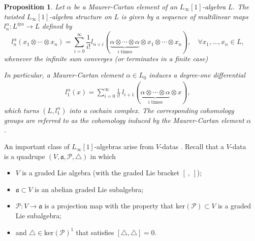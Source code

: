 \documentclass[12pt]{amsart}
\newtheorem{prop}[theorem]{Proposition}
\theoremstyle{definition}
\begin{document}
\begin{prop}\cite[Twisting procedure]{Get09}\label{Twisting procedure}
	Let $\alpha$ be a Maurer-Cartan element of an $L_\infty[1]$-algebra $L$. The twisted $L_\infty[1]$-algebra structure on $L$ is given by a sequence of multilinear maps $l_n^\alpha: L^{\otimes n} \to L$ defined by
	$$
	l_n^\alpha\left(x_1 \otimes \cdots \otimes x_n\right)=\sum_{i=0}^{\infty} \frac{1}{i!} l_{n+i}\left( \underbrace{\alpha\otimes \cdots\otimes \alpha}_{i \text{ times}}\otimes x_1 \otimes \cdots\otimes  x_n \right), \quad \forall x_1, \ldots, x_n \in L,
	$$ whenever the infinite sum converges (or terminates in a finite case)
	
	In particular, a Maurer-Cartan element $\alpha \in L_0$ induces a degree-one differential
	\begin{align*}
		l_1^\alpha (x) = \sum_{i=0}^\infty \frac{1}{i !} ~ \! l_{i+1} (\underbrace{\alpha\otimes \cdots\otimes \alpha}_{i \text{ times}}\otimes x),
	\end{align*}
	which turns $(L, l_1^\alpha)$ into a cochain complex. The corresponding cohomology groups are referred to as the cohomology induced by the Maurer-Cartan element $\alpha$.
	
	
\end{prop}




\medskip

An important class of $L_\infty[1]$-algebras arise from $V$-datas \cite{V05}. Recall that a $V$-data is a quadrupe $(V, \mathfrak{a}, \mathcal{P}, \triangle)$ in which
\begin{itemize}
	\item [(a)]$V$ is a graded Lie algebra (with the graded Lie bracket $[~,~]$);
	\item [(b)]$\mathfrak{a} \subset V$ is an abelian graded Lie subalgebra;
	\item [(c)]$\mathcal{P} : V \rightarrow \mathfrak{a}$ is a projection map with the property that $\mathrm{ker}(\mathcal{P}) \subset V$ is a graded Lie subalgebra;
	\item [(d)]and $\triangle \in \mathrm{ker}(\mathcal{P})^1$ that satisfies $[\triangle, \triangle] = 0$.
\end{itemize}

\end{document}
